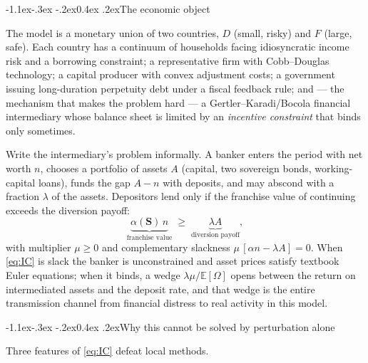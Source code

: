 \documentclass[10pt,a4paper]{article}
\makeatletter
\theoremstyle{definition}
\theoremstyle{plain}
\theoremstyle{remark}
\newcommand{\E}{\mathbb{E}}
\newcommand{\st}{\mathbf{S}}
\renewcommand\subsection{\@startsection{subsection}{2}{\z@}%
  {-1.1ex\@plus -.3ex \@minus -.2ex}{0.4ex \@plus .2ex}{\normalfont\normalsize\bfseries}}
\makeatother
\begin{document}
\subsection{The economic object}

The model is a monetary union of two countries, $D$ (small, risky) and $F$ (large, safe).
Each country has a continuum of households facing idiosyncratic income risk and a borrowing
constraint; a representative firm with Cobb--Douglas technology; a capital producer with
convex adjustment costs; a government issuing long-duration perpetuity debt under a fiscal
feedback rule; and --- the mechanism that makes the problem hard --- a
Gertler--Karadi/Bocola financial intermediary whose balance sheet is limited by an
\emph{incentive constraint} that binds only sometimes.

Write the intermediary's problem informally. A banker enters the period with net worth $n$,
chooses a portfolio of assets $A$ (capital, two sovereign bonds, working-capital loans),
funds the gap $A-n$ with deposits, and may abscond with a fraction $\lambda$ of the assets.
Depositors lend only if the franchise value of continuing exceeds the diversion payoff:
\begin{equation}
  \underbrace{\alpha(\st)\,n}_{\text{franchise value}} \;\ge\; \underbrace{\lambda A}_{\text{diversion payoff}},
  \label{eq:IC}
\end{equation}
with multiplier $\mu \ge 0$ and complementary slackness $\mu\,[\alpha n - \lambda A]=0$. When
\eqref{eq:IC} is slack the banker is unconstrained and asset prices satisfy textbook Euler
equations; when it binds, a wedge $\lambda\mu/\E[\Omega]$ opens between the return on
intermediated assets and the deposit rate, and that wedge is the entire transmission channel
from financial distress to real activity in this model.

\subsection{Why this cannot be solved by perturbation alone}

Three features of \eqref{eq:IC} defeat local methods.
\end{document}
